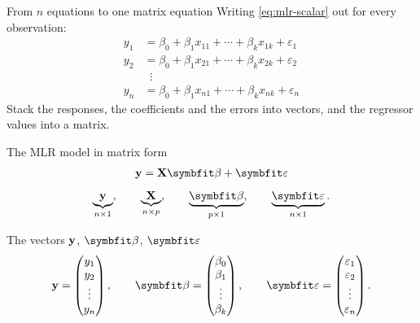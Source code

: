 \begin{frame}{From $n$ equations to one matrix equation}
    Writing \eqref{eq:mlr-scalar} out for every observation:
    \begin{align*}
        y_1 &= \beta_0 + \beta_1 x_{11} + \cdots + \beta_k x_{1k} + \varepsilon_1 \\
        y_2 &= \beta_0 + \beta_1 x_{21} + \cdots + \beta_k x_{2k} + \varepsilon_2 \\
        &\;\;\vdots \\
        y_n &= \beta_0 + \beta_1 x_{n1} + \cdots + \beta_k x_{nk} + \varepsilon_n
    \end{align*}
    Stack the responses, the coefficients and the errors into vectors, and the regressor values into a matrix.
\end{frame}


\begin{frame}{The MLR model in matrix form}
    \begin{align}
        \by = \bX\bbeta + \bvarepsilon \label{eq:mlr-matrix}
    \end{align}
    \[
    \underbrace{\by}_{n\times 1}, \qquad \underbrace{\bX}_{n\times p}, \qquad \underbrace{\bbeta}_{p\times 1}, \qquad \underbrace{\bvarepsilon}_{n\times 1}.
    \]
\end{frame}


\begin{frame}{The vectors $\mathbf{y}$, $\bbeta$, $\bvarepsilon$}
    \[
    \by = \begin{pmatrix} y_1 \\ y_2 \\ \vdots \\ y_n \end{pmatrix}, \qquad
    \bbeta = \begin{pmatrix} \beta_0 \\ \beta_1 \\ \vdots \\ \beta_k \end{pmatrix}, \qquad
    \bvarepsilon = \begin{pmatrix} \varepsilon_1 \\ \varepsilon_2 \\ \vdots \\ \varepsilon_n \end{pmatrix}.
    \]
\end{frame}


